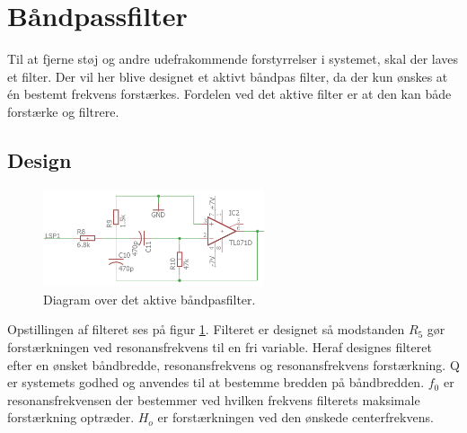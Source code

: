 \section{Båndpassfilter}\label{sec:filter}
Til at fjerne støj og andre udefrakommende forstyrrelser i systemet, skal der laves et filter.
Der vil her blive designet et aktivt båndpas filter, da der kun ønskes at én bestemt frekvens forstærkes.
Fordelen ved det aktive filter er at den kan både forstærke og filtrere.

\subsection{Design}
\begin{figure}
	\centering
	\includegraphics[width=0.58\textwidth]{billeder/ActiveFilter.png}
	\caption{Diagram over det aktive båndpasfilter.}
	\label{fig:ActiveFilter}
\end{figure}
Opstillingen af filteret ses på figur \ref{fig:ActiveFilter}.
Filteret er designet så modstanden $R_5$ gør forstærkningen ved resonansfrekvens til en fri variable.
Heraf designes filteret efter en ønsket båndbredde, resonansfrekvens og resonansfrekvens forstærkning. Q er systemets godhed og anvendes til at bestemme bredden på båndbredden. 
$f_0$ er resonansfrekvensen der bestemmer ved hvilken frekvens filterets maksimale forstærkning optræder.
$H_o$ er forstærkningen ved den ønskede centerfrekvens.
